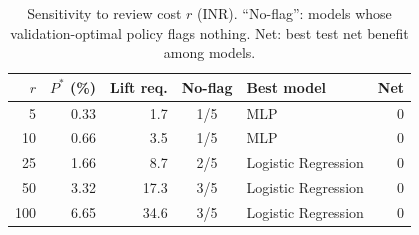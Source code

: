 \documentclass[conference]{IEEEtran}
\begin{document}
\begin{table}[t]
\centering
\caption{Sensitivity to review cost $r$ (INR). ``No-flag'': models whose validation-optimal policy flags nothing. Net: best test net benefit among models.}\label{tab:sens}
\footnotesize
\setlength{\tabcolsep}{3pt}
\begin{tabular}{@{}rrrcl r@{}}
\toprule
$r$ & $P^{*}$ (\%) & Lift req. & No-flag & Best model & Net \\
\midrule
5 & 0.33 & 1.7 & 1/5 & MLP & 0 \\
10 & 0.66 & 3.5 & 1/5 & MLP & 0 \\
25 & 1.66 & 8.7 & 2/5 & Logistic Regression & 0 \\
50 & 3.32 & 17.3 & 3/5 & Logistic Regression & 0 \\
100 & 6.65 & 34.6 & 3/5 & Logistic Regression & 0 \\
\bottomrule
\end{tabular}
\end{table}
\end{document}
